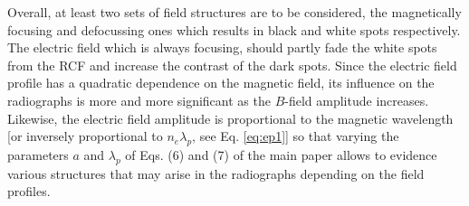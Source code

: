 \documentclass[aps,showpacs,superscriptaddress]{revtex4}
\begin{document}
Overall,   at least two sets of field structures  are to be considered, the magnetically focusing  and  defocussing ones which  results in black and white spots respectively. 
The electric field which is always focusing, should partly  fade the white spots from the RCF and increase the contrast of the dark spots.  
Since the electric field profile has a quadratic dependence on the magnetic field, its influence on the radiographs is more and more significant  as the   $B$-field  amplitude  increases. Likewise,  the electric field amplitude is proportional to the magnetic wavelength [or inversely proportional to $n_e\lambda_p$, see Eq. \eqref{eq:ep1}] so that varying the 
parameters $a$ and $\lambda_p$ of Eqs. (6) and (7) of the main paper
allows to evidence various structures that may arise in the radiographs depending on the field profiles.
\end{document}
